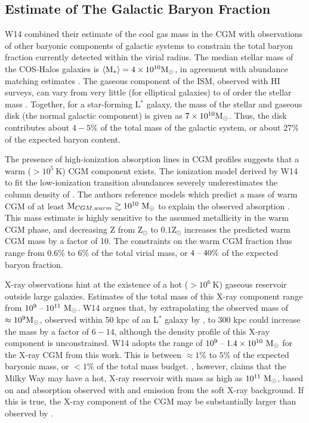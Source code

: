 \subsection{Estimate of The Galactic Baryon Fraction}
\label{sec:Galaxy.Fraction}

W14 combined their estimate of the cool gas mass in the CGM with
observations of other baryonic components of galactic systems to
constrain the total baryon fraction currently detected within the
virial radius. The median stellar mass of the COS-Halos galaxies is
$\left<\textrm{M}{}_*\right> = 4\times 10^{10}\textrm{M}_\odot$, in agreement with
abundance matching estimates \citep{Behroozi2010}. The gaseous
component of the ISM, observed with HI surveys, can vary from very
little (for elliptical galaxies) to of order the stellar mass
\citep{McGaugh2010, Martin2010}. Together, for a star-forming L$^*$
galaxy, the mass of the stellar and gaseous disk (the normal galactic
component) is given as $7\times 10^{10}\textrm{M}_\odot{}$. Thus, the disk
contributes about $4-5\%$ of the total mass of the galactic system, or
about $27\%$ of the expected baryon content.

The presence of high-ionization absorption lines in CGM profiles
suggests that a warm ($>10^5~\textrm{K}$) CGM component exists. The
ionization model derived by W14 to fit the low-ionization transition
abundances severely underestimates the column density of
. The authors reference models which predict a mass of
warm CGM of at least $\textrm{M}_{CGM, warm} \gtrsim 10^{10}~\textrm{M}_\odot{}$ to
explain the observed  absorption \citep{Peeples2014}. This
mass estimate is highly sensitive to the assumed metallicity in the
warm CGM phase, and decreasing Z from Z$_\odot$ to $0.1$Z$_\odot$
increases the predicted warm CGM mass by a factor of 10. The
constraints on the warm CGM fraction thus range from $0.6\%$ to $6\%$
of the total virial mass, or $4\;\textrm{--}\;40\%$ of the expected baryon fraction.

X-ray observations hint at the existence of a hot ($>10^6~\textrm{K}$)
gaseous reservoir outside large galaxies. Estimates of the total mass
of this X-ray component range from $10^9\;\textrm{--}\;10^{11}~\textrm{M}_\odot{}$. W14
argues that, by extrapolating the observed mass of $\approx
10^9\textrm{M}_\odot{}$, observed within 50 kpc of an L$^*$ galaxy by \Rosat{}
\citep{Anderson2013}, to 300 kpc could increase the mass by a factor
of $6-14$, although the density profile of this X-ray component is
unconstrained. W14 adopts the range of $10^9 \;\textrm{--}\;
1.4\times 10^{10}~\textrm{M}_\odot{}$ for the X-ray CGM from this work. This is
between $\approx 1\%$ to $5\%$ of the expected baryonic mass, or
$<1\%$ of the total mass budget. \citet{Gupta2012}, however, claims
that the Milky Way may have a hot, X-ray reservoir with mass as high
as $10^{11}~\textrm{M}_\odot{}$, based on  and 
absorption observed with \XMM{} and emission from the soft X-ray
background. If this is true, the X-ray component of the CGM may be
substantially larger than observed by \citet{Anderson2013}.

